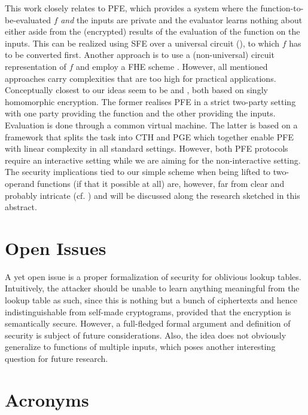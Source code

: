 \documentclass{llncs}
\begin{document}
This work closely relates to \ac{PFE}, which provides a system where the
function-to-be-evaluated $f$ \emph{and} the inputs are private and the
evaluator learns nothing about either aside from the (encrypted) results of
the evaluation of the function on the inputs. This can be realized using
\ac{SFE} over a universal circuit
(\cite{KolesnikovSchneider2008,Valiant1976}), to which $f$ has to be
converted first. Another approach is to use a (non-universal) circuit
representation of $f$ and employ a \ac{FHE} scheme
\cite{Gentry2009,Silverberg2013}. However, all mentioned approaches carry
complexities that are too high for practical applications. Conceptually
closest to our ideas seem to be \cite{KatzMalka2011} and
\cite{MohasselSadeghian2013}, both based on singly homomorphic encryption.
The former realises \ac{PFE} in a strict two-party setting with one party
providing the function and the other providing the inputs. Evaluation is done
through a common virtual machine. The latter is based on a framework that
splits the task into \ac{CTH} and \ac{PGE} which together enable \ac{PFE}
with linear complexity in all standard settings. However, both \ac{PFE}
protocols require an interactive setting while we are aiming for the
non-interactive setting. The security implications tied to our simple scheme
when being lifted to two-operand functions (if that it possible at all) are,
however, far from clear and probably intricate (cf. \cite{Boneh2011}) and
will be discussed along the research sketched in this abstract.

\section{Open Issues}
A yet open issue is a proper formalization of security for oblivious lookup
tables. Intuitively, the attacker should be unable to learn anything
meaningful from the lookup table as such, since this is nothing but a bunch
of ciphertexts and hence indistinguishable from self-made cryptograms,
provided that the encryption is semantically secure. However, a full-fledged
formal argument and definition of security is subject of future
considerations. Also, the idea does not obviously generalize to functions of
multiple inputs, which poses another interesting question for future
research.



\section*{Acronyms}
\begin{acronym}
\end{acronym}
\end{document}
